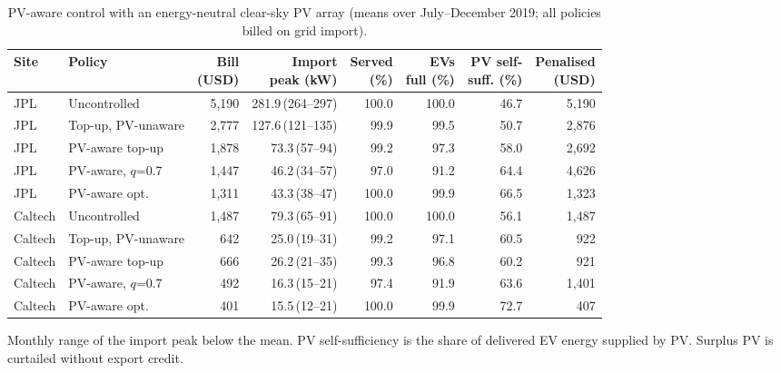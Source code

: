 \begin{table}[!htbp]
\centering
\caption{PV-aware control with an energy-neutral clear-sky PV array (means over July--December 2019; all policies billed on grid import).}
\label{tab:pv}
\footnotesize
\setlength{\tabcolsep}{1.5pt}
\begin{tabular*}{\textwidth}{@{\extracolsep{\fill}}llrrrrrr@{}}
\hline
Site & Policy & \makecell[c]{Bill\\(USD)} & \makecell[c]{Import\\peak (kW)} & \makecell[c]{Served\\(\%)} & \makecell[c]{EVs\\full (\%)} & \makecell[c]{PV self-\\suff. (\%)} & \makecell[c]{Penalised\\(USD)} \\
\hline
JPL & Uncontrolled & 5,190 & 281.9\,{\scriptsize(264--297)} & 100.0 & 100.0 & 46.7 & 5,190 \\
JPL & Top-up, PV-unaware & 2,777 & 127.6\,{\scriptsize(121--135)} & 99.9 & 99.5 & 50.7 & 2,876 \\
JPL & PV-aware top-up & 1,878 & 73.3\,{\scriptsize(57--94)} & 99.2 & 97.3 & 58.0 & 2,692 \\
JPL & PV-aware, $q$=0.7 & 1,447 & 46.2\,{\scriptsize(34--57)} & 97.0 & 91.2 & 64.4 & 4,626 \\
JPL & PV-aware opt. & 1,311 & 43.3\,{\scriptsize(38--47)} & 100.0 & 99.9 & 66.5 & 1,323 \\
\hline
Caltech & Uncontrolled & 1,487 & 79.3\,{\scriptsize(65--91)} & 100.0 & 100.0 & 56.1 & 1,487 \\
Caltech & Top-up, PV-unaware & 642 & 25.0\,{\scriptsize(19--31)} & 99.2 & 97.1 & 60.5 & 922 \\
Caltech & PV-aware top-up & 666 & 26.2\,{\scriptsize(21--35)} & 99.3 & 96.8 & 60.2 & 921 \\
Caltech & PV-aware, $q$=0.7 & 492 & 16.3\,{\scriptsize(15--21)} & 97.4 & 91.9 & 63.6 & 1,401 \\
Caltech & PV-aware opt. & 401 & 15.5\,{\scriptsize(12--21)} & 100.0 & 99.9 & 72.7 & 407 \\
\hline
\end{tabular*}
\par\smallskip\parbox{\textwidth}{\scriptsize Monthly range of the import peak below the mean. PV self-sufficiency is the share of delivered EV energy supplied by PV. Surplus PV is curtailed without export credit.}
\end{table}
